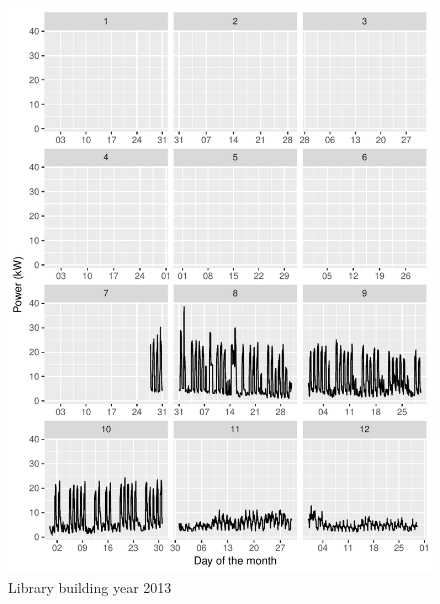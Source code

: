 \documentclass[11pt, oneside]{article}   	%
\begin{document}
\begin{figure}
\includegraphics[keepaspectratio]{library_build_Y2013.pdf}
\caption{Library building year 2013 }
\end{figure}
\end{document}
